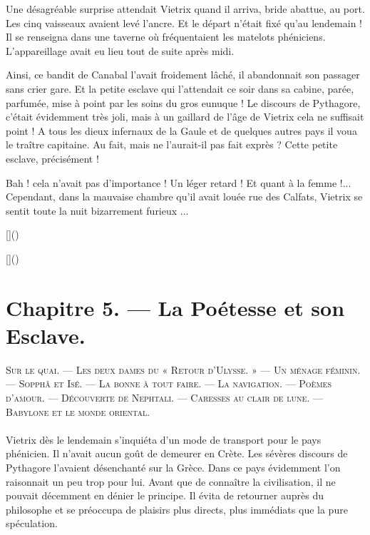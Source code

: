 \documentclass[a4paper, 11pt, oneside, polutonikogreek, french]{article}
\begin{document}
\bigskip
\centerline{\EightStarTaper}
\centerline{\EightStarTaper\EightStarTaper}
\bigskip

Une désagréable surprise attendait Vietrix quand il arriva, bride abattue, au port. Les cinq vaisseaux avaient levé l'ancre. Et le départ n'était fixé qu'au lendemain ! Il se renseigna dans une taverne où fréquentaient les matelots phéniciens. L'appareillage avait eu lieu tout de suite après midi.

Ainsi, ce bandit de Canabal l'avait froidement lâché, il abandonnait son passager sans crier gare. Et la petite esclave qui l'attendait ce soir dans sa cabine, parée, parfumée, mise à point par les soins du gros eunuque ! Le discours de Pythagore, c'était évidemment très joli, mais à un gaillard de l'âge de Vietrix cela ne suffisait point ! A tous les dieux infernaux de la Gaule et de quelques autres pays il voua le traître capitaine. Au fait, mais ne l'aurait-il pas fait exprès ? Cette petite esclave, précisément !

Bah ! cela n'avait pas d'importance ! Un léger retard ! Et quant à la femme !... Cependant, dans la mauvaise chambre qu'il avait louée rue des Calfats, Vietrix se sentit toute la nuit bizarrement furieux ...

[]()

[]()
\clearpage
\section{Chapitre 5. --- La Poétesse et son Esclave.}
\begin{center}
\scshape
\small
Sur le quai. --- Les deux dames du « Retour d'Ulysse. » --- Un ménage féminin. --- Sopphâ et Isé. --- La bonne à tout faire. --- La navigation. --- Poèmes d'amour. --- Découverte de Nephtali. --- Caresses au clair de lune. --- Babylone et le monde oriental.
\end{center}
\paragraph{}
Vietrix dès le lendemain s'inquiéta d'un mode de transport pour le pays phénicien. Il n'avait aucun goût de demeurer en Crète. Les sévères discours de Pythagore l'avaient désenchanté sur la Grèce. Dans ce pays évidemment l'on raisonnait un peu trop pour lui. Avant que de connaître la civilisation, il ne pouvait décemment en dénier le principe. Il évita de retourner auprès du philosophe et se préoccupa de plaisirs plus directs, plus immédiats que la pure spéculation.
\end{document}

